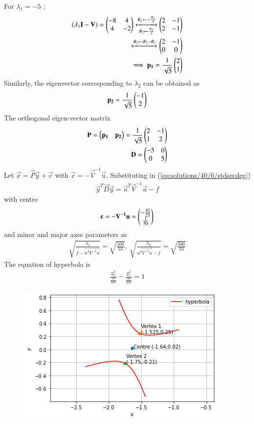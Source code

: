 For $\lambda_1 = -5$ :
\begin{align}
	(\lambda_1\mathbf{I}-\mathbf{V})=\begin{pmatrix}-8 & 4 \\ 4 & -2\end{pmatrix} 
	\xleftrightarrow[R_2 \leftarrow \frac{R_2}{2}]{R_1 \leftarrow -\frac{R_1}{4}}
	\begin{pmatrix}2 & -1 \\ 2 & -1\end{pmatrix} \\
	\xleftrightarrow[]{R_2 \leftarrow R_2 - R_1}
	\begin{pmatrix}2 & -1 \\ 0 & 0\end{pmatrix} \\
	\implies \mathbf{p_1}=\frac{1}{\sqrt{5}}\begin{pmatrix}2 \\ 1\end{pmatrix}
\end{align}
Similarly, the eigenvector corresponding to $\lambda_2$ can be obtained as
\begin{align}
	\mathbf{p_2}=\frac{1}{\sqrt{5}}\begin{pmatrix}-1\\2\end{pmatrix}
\end{align}
The orthogonal eigen-vector matrix
\begin{align}
	\mathbf{P}=\begin{pmatrix}\mathbf{p_1} & \mathbf{p_2}\end{pmatrix}
	=\frac{1}{\sqrt{5}}\begin{pmatrix}2 & -1 \\ 1 & 2\end{pmatrix} \\
	\mathbf{D}=\begin{pmatrix}-5 & 0 \\ 0 & 5\end{pmatrix}
\end{align}
Let $\vec{x}=\vec{P}\vec{y} + \vec{c} $ with $\vec{c}=-\vec{V}^{-1}\vec{u}$. Substituting in (\ref{eq:solutions/40/6/stdsecdeg})
\begin{align}
	\vec{y}^T\vec{D}\vec{y}=\vec{u}^T\vec{V}^{-1}\vec{u}-f 
\end{align}
with centre
\begin{align}
	\mathbf{c}=-\mathbf{V^{-1}u}=\begin{pmatrix}-\frac{41}{25} \\ \frac{1}{50}\end{pmatrix} 
\end{align}
and minor and major axes parameters as
\begin{align}
	\sqrt{\frac{\lambda_1}{f-\vec{u^{T}V^{-1}u}}} = \sqrt{\frac{500}{33}}, \
	\sqrt{\frac{\lambda_2}{\vec{u^{T}V^{-1}u}-f}} = \sqrt{\frac{500}{33}}
\end{align}
The equation of hyperbola is
\begin{align}
	\frac{y_2^2}{\frac{33}{500}}-\frac{y_1^2}{\frac{33}{500}}=1
\end{align}
\begin{figure}[!h]
	\includegraphics[width=\columnwidth]{./solutions/40/6/hyper.png}
	\caption{} \label{eq:solutions/40/6/linefig1}
\end{figure}
